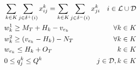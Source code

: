 \documentclass{article}
\begin{document}
\begin{alignat}{3}
    \label{mod:c26}        & \sum_{k \in K}\sum_{j \in \delta^{+}(i)} {x^{k}_{ij} } =  \sum_{k \in K}\sum_{j \in \delta^{-}(i)}{x^{k}_{ji} }                                                                                                                                                                        & i \in \mathcal{L} \cup \mathcal{D}                                                               \\
    \label{mod:c29}        & w^1_k \geq  M_T + H_k - v_{e_k}                                                                                                                                                                                                                                                        & \hspace{-20mm} \forall k \in K                                                                   \\
    \label{mod:c30}        & w^2_k \geq (v_{e_k} - H_k) - N_T                                                                                                                                                                                                                                                       & \hspace{-20mm} \forall k \in K                                                                   \\
    \label{mod:c31}        & w_{e_k} \leq H_k + O_T                                                                                                                                                                                                                                                                 & \hspace{-00mm}  k \in K \hspace{0mm}                                                             \\
    \label{mod:c32}        & 0 \leq q^k_j \leq Q^k                                                                                                                                                                                                                                                                  & \hspace{-20mm}  j \in \mathcal{D}, k \in K                                                       \\

\end{alignat}
\end{document}
